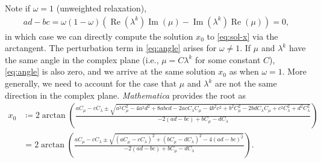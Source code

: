 \documentclass[VANCOUVER,STIX1COL]{WileyNJD-v2}
\newcommand{\Rea}{\operatorname{Re}}
\newcommand{\Ima}{\operatorname{Im}}
\begin{document}
%
Note if $\omega = 1$ (unweighted relaxation),
%
\begin{align}\label{eq:angle}
ad - bc = \omega(1-\omega)(\Rea(\lambda^k)\Ima(\mu) - \Ima(\lambda^k)\Rea(\mu)) = 0,
\end{align}
%
in which case we can directly compute the solution $x_0$ to \eqref{eq:sol-x}
via the arctangent. The perturbation term in \eqref{eq:angle} arises for
$\omega \neq 1$. If $\mu$ and $\lambda^k$ have the same angle in the complex plane
(i.e., $\mu = C\lambda^k$ for some constant $C$), \eqref{eq:angle} is also
zero, and we arrive at the same solution $x_0$ as when $\omega = 1$. More
generally, we need to account for the case that $\mu$ and $\lambda^k$ are
not the same direction in the complex plane. \emph{Mathematica} provides
the root as
%
\begin{align}\nonumber
x_0 & \coloneqq 2\arctan\left(\frac{a C_\mu - c C_\lambda \pm \sqrt{a^2 C_\mu^2 - 4 a^2 d^2 + 8 a b c d - 2 a c C_\lambda C_\mu - 4 b^2 c^2 + b^2 C_\mu^2 - 2 bd C_\lambda C_\mu + c^2 C_\lambda^2 + d^2C_\lambda^2 }}{-2(a d - b c) + b C_\mu - dC_\lambda}\right) \\
& = 2\arctan\left(\frac{a C_\mu - c C_\lambda \pm \sqrt{(aC_\mu - cC_\lambda)^2 + 
	(bC_\mu - dC_\lambda)^2 - 4(ad-bc)^2}}{-2(a d - b c) + b C_\mu - dC_\lambda}\right).\label{eq:max}
\end{align}
%
\end{document}
